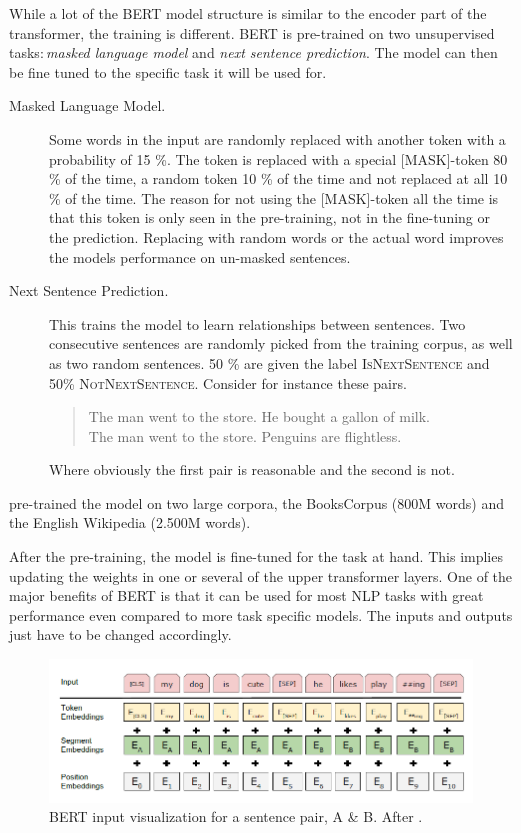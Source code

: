 While a lot of the BERT model structure is similar to the encoder part of the transformer, the training is different. BERT is pre-trained on two unsupervised tasks$\colon$\emph{masked language model} and \emph{next sentence prediction}. The model can then be fine tuned to the specific task it will be used for. 
\begin{description}
    \item[Masked Language Model.] Some words in the input are randomly replaced with another token with a probability of 15 \%. The token is replaced with a special \textsc{[MASK]}-token 80 \% of the time, a random token 10 \% of the time and not replaced at all 10 \% of the time. The reason for not using the \textsc{[MASK]}-token all the time is that this token is only seen in the pre-training, not in the fine-tuning or the prediction. Replacing with random words or the actual word improves the models performance on un-masked sentences. 
    \item[Next Sentence Prediction. ] This trains the model to learn relationships between sentences. Two consecutive sentences are randomly picked from the training corpus, as well as two random sentences. 50 \% are given the label \textsc{IsNextSentence} and 50\% \textsc{NotNextSentence}. Consider for instance these pairs. 
    \begin{quote}
        The man went to the store. 
        He bought a gallon of milk. \\
        The man went to the store.
        Penguins are flightless. 
    \end{quote}
    Where obviously the first pair is reasonable and the second is not.
\end{description}
\citeauthor{devlin2018bert} pre-trained the model on two large corpora, the BooksCorpus (800M words) and the English Wikipedia (2.500M words). 

After the pre-training, the model is fine-tuned for the task at hand. This implies updating the weights in one or several of the upper transformer layers. One of the major benefits of BERT is that it can be used for most NLP tasks with great performance even compared to more task specific models. The inputs and outputs just have to be changed accordingly. 

\begin{figure}[ht]
    \centering
    \includegraphics[width=\textwidth]{Figures/bert_inputrep.png}
    \caption{BERT input visualization for a sentence pair, A \& B. After \citet{devlin2018bert}.}
    \label{fig:berttokens}
\end{figure}

